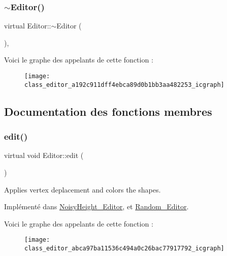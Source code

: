 \subsubsection{\texorpdfstring{$\sim$\+Editor()}{~Editor()}}
{\footnotesize\ttfamily virtual Editor\+::$\sim$\+Editor (\begin{DoxyParamCaption}{ }\end{DoxyParamCaption})\hspace{0.3cm}{\ttfamily [virtual]}, {\ttfamily [default]}}

Voici le graphe des appelants de cette fonction \+:\nopagebreak
\begin{figure}[H]
\begin{center}
\leavevmode
\texttt{[image: class\_editor\_a192c911dff4ebca89d0b1bb3aa482253\_icgraph]}
\end{center}
\end{figure}


\subsection{Documentation des fonctions membres}
\mbox{\label{class_editor_abca97ba11536c494a0c26bac77917792}} 
\subsubsection{\texorpdfstring{edit()}{edit()}}
{\footnotesize\ttfamily virtual void Editor\+::edit (\begin{DoxyParamCaption}{ }\end{DoxyParamCaption})\hspace{0.3cm}{\ttfamily [pure virtual]}}



Applies vertex deplacement and colors the shapes. 



Implémenté dans \hyperlink{class_noisy_height___editor_a3ed5c7267dec56ff2f21366ce2ae9818}{Noisy\+Height\+\_\+\+Editor}, et \hyperlink{class_random___editor_abea41199b1502f89be0b2914b3c191fc}{Random\+\_\+\+Editor}.

Voici le graphe des appelants de cette fonction \+:\nopagebreak
\begin{figure}[H]
\begin{center}
\leavevmode
\texttt{[image: class\_editor\_abca97ba11536c494a0c26bac77917792\_icgraph]}
\end{center}
\end{figure}
\mbox{\label{class_editor_a5747cd74b71d67f6d39b094071058382}} 
